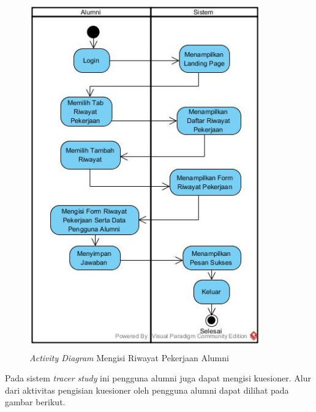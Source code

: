 \begin{figure}[H]
	\centering
	\includegraphics[width=10cm,height=15cm]{gambar/Activityriwayatpekerjaan}
	\caption{\emph{Activity Diagram} Mengisi Riwayat Pekerjaan Alumni}
	\label{activity_pekerjaanalumni}
\end{figure}

Pada sistem \textit{tracer study} ini pengguna alumni juga dapat mengisi kuesioner. Alur dari aktivitas pengisian kuesioner oleh pengguna alumni dapat dilihat pada gambar berikut.

